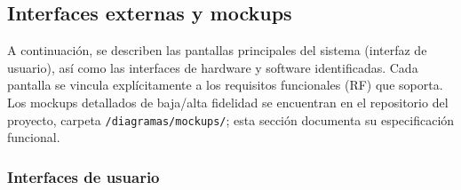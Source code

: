 \documentclass[11pt,a4paper]{article}
\begin{document}
	\subsection{ Interfaces externas y mockups}
	
	A continuación, se describen las pantallas principales del sistema (interfaz de usuario), así como las interfaces de hardware y software identificadas. Cada pantalla se vincula explícitamente a los requisitos funcionales (RF) que soporta. Los mockups detallados de baja/alta fidelidad se encuentran en el repositorio del proyecto, carpeta \texttt{/diagramas/mockups/}; esta sección documenta su especificación funcional.
	
	\subsubsection{ Interfaces de usuario}
	
	
	
\end{document}
